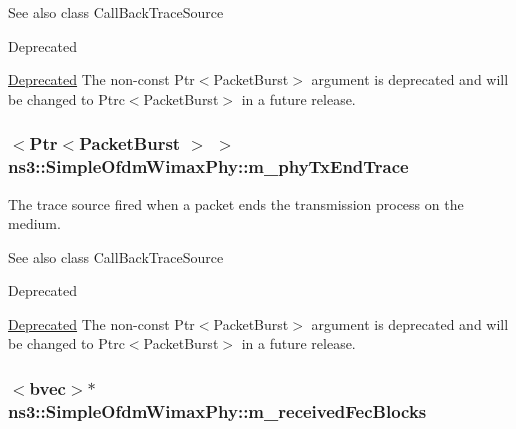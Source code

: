 \begin{DoxySeeAlso}{See also}
class Call\+Back\+Trace\+Source 
\end{DoxySeeAlso}
\begin{DoxyRefDesc}{Deprecated}
\item[\hyperlink{deprecated__deprecated000039}{Deprecated}]The non-\/const {\ttfamily Ptr$<$\+Packet\+Burst$>$} argument is deprecated and will be changed to {\ttfamily Ptrc$<$\+Packet\+Burst$>$} in a future release. \end{DoxyRefDesc}
\subsubsection[{\texorpdfstring{m\+\_\+phy\+Tx\+End\+Trace}{m_phyTxEndTrace}}]{$<${\bf Ptr}$<${\bf Packet\+Burst} $>$ $>$ ns3\+::\+Simple\+Ofdm\+Wimax\+Phy\+::m\+\_\+phy\+Tx\+End\+Trace\hspace{0.3cm}{\ttfamily [private]}}\hypertarget{classns3_1_1SimpleOfdmWimaxPhy_a25cc58eaaab4ca6692c29140562c709c}{}\label{classns3_1_1SimpleOfdmWimaxPhy_a25cc58eaaab4ca6692c29140562c709c}
The trace source fired when a packet ends the transmission process on the medium.

\begin{DoxySeeAlso}{See also}
class Call\+Back\+Trace\+Source 
\end{DoxySeeAlso}
\begin{DoxyRefDesc}{Deprecated}
\item[\hyperlink{deprecated__deprecated000038}{Deprecated}]The non-\/const {\ttfamily Ptr$<$\+Packet\+Burst$>$} argument is deprecated and will be changed to {\ttfamily Ptrc$<$\+Packet\+Burst$>$} in a future release. \end{DoxyRefDesc}
\subsubsection[{\texorpdfstring{m\+\_\+received\+Fec\+Blocks}{m_receivedFecBlocks}}]{$<${\bf bvec}$>$$\ast$ ns3\+::\+Simple\+Ofdm\+Wimax\+Phy\+::m\+\_\+received\+Fec\+Blocks\hspace{0.3cm}{\ttfamily [private]}}\hypertarget{classns3_1_1SimpleOfdmWimaxPhy_ab49fe9b381b1d96514209004f8b80346}{}\label{classns3_1_1SimpleOfdmWimaxPhy_ab49fe9b381b1d96514209004f8b80346}


